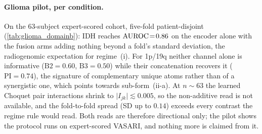 \paragraph{Glioma pilot, per condition.}
On the $63$-subject expert-scored cohort, five-fold patient-disjoint
(\cref{tab:glioma_domainb}): IDH reaches $\text{AUROC}\!=\!0.86$ on the
encoder alone with the fusion arms adding nothing beyond a fold's
standard deviation, the radiogenomic expectation for regime~(i). For
1p/19q neither channel alone is informative ($\mathrm{B2}\!=\!0.60$,
$\mathrm{B3}\!=\!0.50$) while their concatenation recovers it
($\mathrm{PI}\!=\!0.74$), the signature of complementary unique atoms
rather than of a synergistic one, which points towards sub-form~(ii-a).
At $n\!\sim\!63$ the learned Choquet pair interactions shrink to
$\lvert I_{jk}\rvert\!\lesssim\!0.005$, so the non-additive read is not
available, and the fold-to-fold spread (SD up to $0.14$) exceeds every
contrast the regime rule would read. Both reads are therefore
directional only; the pilot shows the protocol runs on expert-scored
VASARI, and nothing more is claimed from it.

